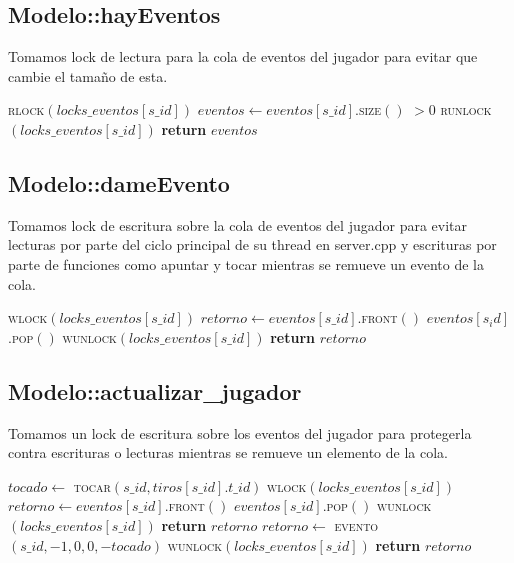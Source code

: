 \documentclass[a4paper,10pt,twoside]{article}
\newenvironment{pseudo}[1][]{%
    \vspace{0.5em}%
    \begin{algorithmic}%
}
{%
    \end{algorithmic}%
    \vspace{0.5em}%
}
\newcommand{\Fn}[2]{\textsc{#1}$(#2)$}
\newcommand{\PReturn}[1]{\textbf{return} $#1$}
\begin{document}
\subsection{Modelo::hayEventos}

Tomamos lock de lectura para la cola de eventos del jugador para evitar que cambie el tamaño de esta.

\begin{pseudo}
        \State \Fn{rlock}{locks\_eventos[s\_id]}
        \State $eventos \leftarrow eventos[s\_id]$.\Fn{size}{} $> 0$
        \State \Fn{runlock}{locks\_eventos[s\_id]}
        \State \PReturn{eventos}
    \EndProcedure
\end{pseudo}


\subsection{Modelo::dameEvento}

Tomamos lock de escritura sobre la cola de eventos del jugador para evitar lecturas por parte del ciclo principal de su thread en server.cpp y escrituras por parte de funciones como apuntar y tocar mientras se remueve un evento de la cola.

\begin{pseudo}
        \State \Fn{wlock}{locks\_eventos[s\_id]}
        \State $retorno \leftarrow eventos[s\_id]$.\Fn{front}{}
        \State $eventos[s_id]$.\Fn{pop}{}
        \State \Fn{wunlock}{locks\_eventos[s\_id]}
        \State \PReturn{retorno}
    \EndProcedure
\end{pseudo}


\subsection{Modelo::actualizar\_jugador}

Tomamos un lock de escritura sobre los eventos del jugador para protegerla contra escrituras o lecturas
mientras se remueve un elemento de la cola. 

\begin{pseudo}
        \State $tocado \leftarrow$ \Fn{tocar}{s\_id, tiros[s\_id].t\_id}
        \State \Fn{wlock}{locks\_eventos[s\_id]}
        \If{$eventos[s\_id]$.\Fn{size}{} $> 0$}
            \State $retorno \leftarrow eventos[s\_id]$.\Fn{front}{}
            \State $eventos[s\_id]$.\Fn{pop}{}
            \State \Fn{wunlock}{locks\_eventos[s\_id]}
            \State \PReturn{retorno}
        \Else
            \State $retorno \leftarrow$ \Fn{evento}{s\_id, -1, 0, 0, -tocado}
            \State \Fn{wunlock}{locks\_eventos[s\_id]}
            \State \PReturn{retorno}
        \EndIf
    \EndProcedure
\end{pseudo}
\end{document}
